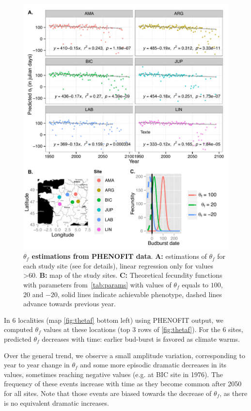 \begin{figure}[ht!]
	\centering
	\includegraphics[scale=1]{Figures/optsmaps.pdf}
	\caption{\textbf{$\theta_{f}$ estimations from PHENOFIT data}. \textbf{A:} estimations of $\theta_f$ for each study site (see  for details), linear regression only for values >60. \textbf{B:} map of the study sites. \textbf{C:} Theoretical fecundity functions with parameters from~\autoref{tab:params} with values of $\theta_f$ equals to $100$, $20$ and $-20$, solid lines indicate achievable phenotype, dashed lines advance towards previous year.}
	\label{fig:thetaf}
\end{figure}

In 6 localities (map \autoref{fig:thetaf} bottom left) using \textsc{PHENOFIT} output, we computed $\theta_f$ values at these locations (top 3 rows of \autoref{fig:thetaf}). For the 6 sites, predicted $\theta_f$ decreases with time: earlier bud-burst is favored as climate warms.

Over the general trend, we observe a small amplitude variation, corresponding to year to year change in $\theta_f$ and some more episodic dramatic decreases in its values, sometimes reaching negative values (e.g. at BIC site in 1976). The frequency of these events increase with time as they become common after 2050 for all sites. Note that those events are biased towards the decrease of $\theta_f$, as there is no equivalent dramatic increases.

